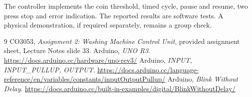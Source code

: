 \vspace{6pt}
The controller implements the coin threshold, timed cycle, pause and resume,
two press stop and error indication. The reported results are software tests.
A physical demonstration, if required separately, remains a group check.

\vspace{2pt}
\begingroup\small
\renewcommand{\refname}{References}
\begin{thebibliography}{9}
 CO3053, \textit{Assignment 2: Washing Machine Control Unit}, provided assignment sheet, Lecture Notes slide 33.
 Arduino, \textit{UNO R3}. \url{https://docs.arduino.cc/hardware/uno-rev3/}
 Arduino, \textit{INPUT, INPUT\_PULLUP, OUTPUT}. \url{https://docs.arduino.cc/language-reference/en/variables/constants/inputOutputPullup/}
 Arduino, \textit{Blink Without Delay}. \url{https://docs.arduino.cc/built-in-examples/digital/BlinkWithoutDelay/}
\end{thebibliography}
\endgroup
